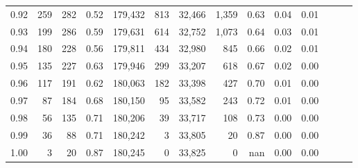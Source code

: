 \begin{tabular}{rrrrrrrrrrrrrr}
0.92 &    259 &  282 &  0.52 &  179,432 &      813 &  32,466 &   1,359 &  0.63 &  0.04 &      0.01 \\
0.93 &    199 &  286 &  0.59 &  179,631 &      614 &  32,752 &   1,073 &  0.64 &  0.03 &      0.01 \\
0.94 &    180 &  228 &  0.56 &  179,811 &      434 &  32,980 &     845 &  0.66 &  0.02 &      0.01 \\
0.95 &    135 &  227 &  0.63 &  179,946 &      299 &  33,207 &     618 &  0.67 &  0.02 &      0.00 \\
0.96 &    117 &  191 &  0.62 &  180,063 &      182 &  33,398 &     427 &  0.70 &  0.01 &      0.00 \\
0.97 &     87 &  184 &  0.68 &  180,150 &       95 &  33,582 &     243 &  0.72 &  0.01 &      0.00 \\
0.98 &     56 &  135 &  0.71 &  180,206 &       39 &  33,717 &     108 &  0.73 &  0.00 &      0.00 \\
0.99 &     36 &   88 &  0.71 &  180,242 &        3 &  33,805 &      20 &  0.87 &  0.00 &      0.00 \\
1.00 &      3 &   20 &  0.87 &  180,245 &        0 &  33,825 &       0 &   nan &  0.00 &      0.00 \\
\bottomrule
\end{tabular}
